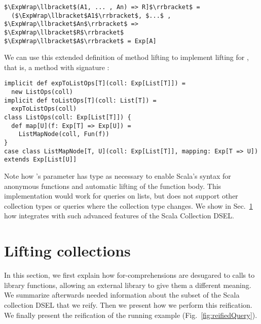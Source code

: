 \begin{lstlisting}
$\ExpWrap\llbracket$(A1, ... , An) => R]$\rrbracket$ =
  ($\ExpWrap\llbracket$A1$\rrbracket$, $...$ , $\ExpWrap\llbracket$An$\rrbracket$ => $\ExpWrap\llbracket$R$\rrbracket$
$\ExpWrap\llbracket$A$\rrbracket$ = Exp[A]
\end{lstlisting}

We can use this extended definition of method lifting to  implement  lifting for , that is, a method with signature :

\begin{lstlisting}
implicit def expToListOps[T](coll: Exp[List[T]]) = 
  new ListOps(coll)
implicit def toListOps[T](coll: List[T]) = 
  expToListOps(coll)
class ListOps(coll: Exp[List[T]]) {
  def map[U](f: Exp[T] => Exp[U]) =
    ListMapNode(coll, Fun(f))
}
case class ListMapNode[T, U](coll: Exp[List[T]], mapping: Exp[T => U]) extends Exp[List[U]]
\end{lstlisting}

Note how 's parameter  has type  as necessary to enable Scala's syntax for anonymous functions and automatic lifting of the function body. This implementation would work for queries on lists, but does not support other collection types or queries where the collection type changes. We show in Sec.~\ref{subsec:collections} how {\LoS} integrates with such advanced features of the Scala Collection DSEL.


\section{Lifting collections}
\label{subsec:collections}
In this section, we first explain how for-comprehensions are desugared to calls to library functions, allowing an external library to give them a different meaning. We summarize afterwards needed information about the subset of the Scala collection DSEL that we reify. Then we present how we perform this reification.
We finally present the reification of the running example (Fig.~\ref{fig:reifiedQuery}).

